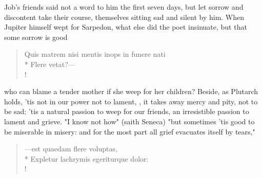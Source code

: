 {Job's friends said not a word to him the first seven days, but let sorrow and discontent take their course, themselves sitting sad and silent by him. When Jupiter himself wept for Sarpedon, what else did the poet insinuate, but that some sorrow is good

%
\begin{latin}%
\begin{verse}%
Quis matrem nisi mentis inops in funere nati\\*
Flere vetat?---\\!
\end{verse}%
\end{latin}%

who can blame a tender mother if she weep for her children? Beside, as Plutarch holds, 'tis not in our power not to lament, , it takes away mercy and pity, not to be sad; 'tis a natural passion to weep for our friends, an irresistible passion to lament and grieve. "I know not how" (saith Seneca) "but sometimes 'tis good to be miserable in misery: and for the most part all grief evacuates itself by tears,"

%
\begin{latin}%
\begin{verse}%
---est quaedam flere voluptas,\\*
Expletur lachrymis egeriturque dolor:\\!
\end{verse}%
\end{latin}%

}
